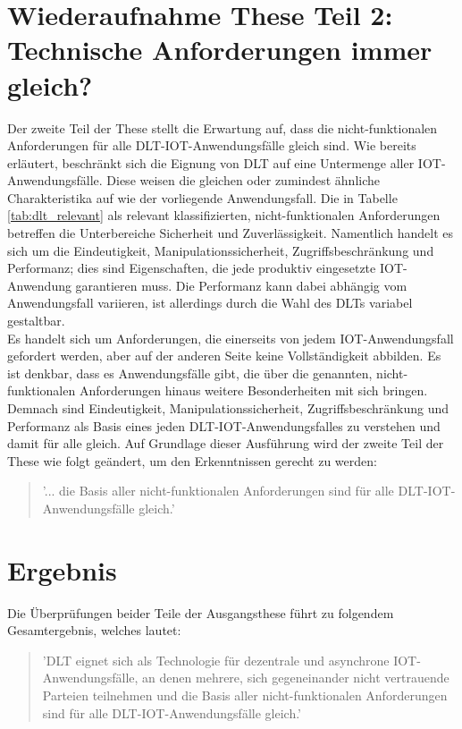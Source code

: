 \section{Wiederaufnahme These Teil 2: Technische Anforderungen immer gleich?}
\label{sec:discussion:part2}
Der zweite Teil der These stellt die Erwartung auf, dass die nicht-funktionalen Anforderungen für alle \ac{DLT}-\ac{IOT}-Anwendungsfälle gleich sind. Wie bereits erläutert, beschränkt sich die Eignung von \ac{DLT} auf eine Untermenge aller \ac{IOT}-Anwendungsfälle. Diese weisen die gleichen oder zumindest ähnliche Charakteristika auf wie der vorliegende Anwendungsfall. Die in Tabelle \ref{tab:dlt_relevant} als relevant klassifizierten, nicht-funktionalen Anforderungen betreffen die Unterbereiche Sicherheit und Zuverlässigkeit. Namentlich handelt es sich um die Eindeutigkeit, Manipulationssicherheit, Zugriffsbeschränkung und Performanz; dies sind Eigenschaften, die jede produktiv eingesetzte \ac{IOT}-Anwendung garantieren muss. Die Performanz kann dabei abhängig vom Anwendungsfall variieren, ist allerdings durch die Wahl des \acp{DLT} variabel gestaltbar.\\
Es handelt sich um Anforderungen, die einerseits von jedem \ac{IOT}-Anwendungsfall gefordert werden, aber auf der anderen Seite keine Vollständigkeit abbilden. Es ist denkbar, dass es Anwendungsfälle gibt, die über die genannten, nicht-funktionalen Anforderungen hinaus weitere Besonderheiten mit sich bringen. Demnach sind Eindeutigkeit, Manipulationssicherheit, Zugriffsbeschränkung und Performanz als Basis eines jeden \ac{DLT}-\ac{IOT}-Anwendungsfalles zu verstehen und damit für alle gleich. Auf Grundlage dieser Ausführung wird der zweite Teil der These wie folgt geändert, um den Erkenntnissen gerecht zu werden:
\begin{quote}
  '... die Basis aller nicht-funktionalen Anforderungen sind für alle \ac{DLT}-\ac{IOT}-Anwendungsfälle gleich.'
\end{quote}


\section{Ergebnis}
\label{sec:discussion:result}
Die Überprüfungen beider Teile der Ausgangsthese führt zu folgendem Gesamtergebnis, welches lautet:
\begin{quote}
  '\ac{DLT} eignet sich als Technologie für dezentrale und asynchrone \ac{IOT}-Anwendungsfälle, an denen mehrere, sich gegeneinander nicht vertrauende Parteien teilnehmen und die Basis aller nicht-funktionalen Anforderungen sind für alle \ac{DLT}-\ac{IOT}-Anwendungsfälle gleich.'
\end{quote}
